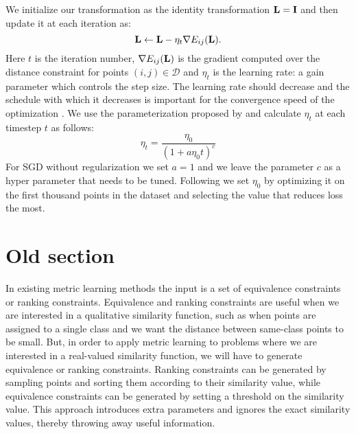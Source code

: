 We initialize our transformation as the identity transformation $\mathbf{L} = \mathbf{I}$ and then update it at each iteration as:
\begin{equation}
\mathbf{L} \leftarrow \mathbf{L} - \eta_{t} \nabla E_{ij}(\mathbf{L}).
\label{eq:update}
\end{equation}
Here $t$ is the iteration number, $\nabla E_{ij}(\mathbf{L})$ is the gradient computed over the distance constraint for points $(i,j) \in \mathcal{D}$ and $\eta_{t}$ is the learning rate: a gain parameter which controls the step size. The learning rate should decrease and the schedule with which it decreases is important for the convergence speed of the optimization \cite{xu2011towards}. We use the parameterization proposed by \cite{xu2011towards} and calculate $\eta_{t}$ at each timestep $t$ as follows:
\begin{equation}
\eta_{t} = \frac{\eta_0}{\left(1+ a \eta_0 t \right)^c}
\label{eq:eta_update}
\end{equation}
For SGD without regularization we set $a = 1$ and we leave the parameter $c$ as a hyper parameter that needs to be tuned. Following \cite{bottou2008tradeoffs} we set $\eta_0$ by optimizing it on the first thousand points in the dataset and selecting the value that reduces loss the most.




\section*{Old section}


In existing metric learning methods the input is a set of equivalence constraints or ranking constraints. Equivalence and ranking constraints are useful when we are interested in a qualitative similarity function, such as when points are assigned to a single class and we want the distance between same-class points to be small. But, in order to apply metric learning to problems where we are interested in a real-valued similarity function, we will have to generate equivalence or ranking constraints. Ranking constraints can be generated by sampling points and sorting them according to their similarity value, while equivalence constraints can be generated by setting a threshold on the similarity value. This approach introduces extra parameters and ignores the exact similarity values, thereby throwing away useful information.

